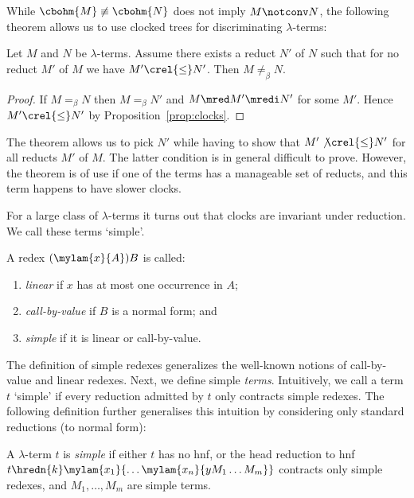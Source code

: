 While $\cbohm{M} \not\equiv \cbohm{N}$ does not imply $M \notconv N$,
the following theorem allows us to use clocked \bohm{} trees
for discriminating $\lambda$-terms:
\begin{theorem}\label{thm:general}
  Let $M$ and $N$ be $\lambda$-terms.
  Assume there exists a reduct $N'$ of $N$
  such that for no reduct $M'$ of $M$ we have
  $M' \crel{\le} N'$.
  Then $M \ne_\beta N$.
\end{theorem}
\begin{proof}
  If $M =_\beta N$ then $M =_\beta N'$ and $M \mred M' \mredi N'$
  for some $M'$. Hence $M' \crel{\le} N'$ by Proposition~\ref{prop:clocks}.
\end{proof}

\noindent
The theorem allows us to pick $N'$
while having to show that $M' \not\crel{\le} N'$ for all reducts $M'$ of $M$.
The latter condition is in general difficult to prove.
However, the theorem is of use if one of the terms 
has a manageable set of reducts, and this term happens to have slower clocks.

For a large class of $\lambda$-terms it turns out that clocks are invariant under reduction.
We call these terms `simple'.
\begin{definition}
  A redex $(\mylam{x}{A}){B}$ is called:
  \begin{enumerate}\setlength{\itemsep}{0ex}
    \item \emph{linear} if $x$ has at most one occurrence in $A$;
    \item \emph{call-by-value} if $B$ is a normal form; and
    \item \emph{simple} if it is linear or call-by-value.
  \end{enumerate}
\end{definition}


The definition of simple redexes generalizes the well-known notions
of call-by-value and linear redexes. 
Next, we define simple \emph{terms}.
Intuitively, we call a term $t$ `simple' if every reduction
admitted by $t$ only contracts simple redexes.
The following definition further generalises this intuition by considering
only standard reductions (to normal form):
\begin{definition}
  A $\lambda$-term $t$ is \emph{simple}
  if either $t$ has no hnf, 
  or the head reduction to hnf $t \hredn{k} \mylam{x_1}{\ldots\mylam{x_n}{y M_1 \ldots M_m}}$
  contracts only simple redexes,
  and $M_1,\ldots,M_m$ are simple terms.
\end{definition}

